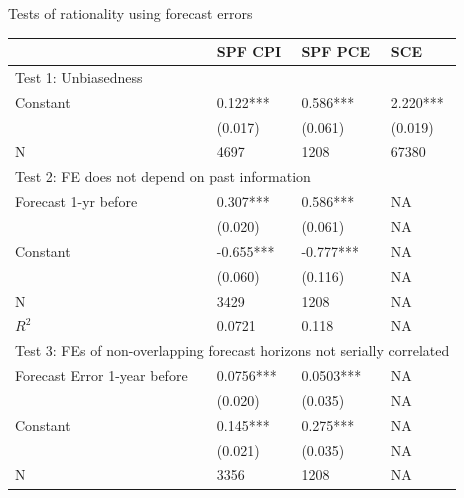 \documentclass{beamer}
\begin{document}
\begin{frame}{Tests of rationality using forecast errors}
	\begin{adjustbox}{totalheight=0.9\textheight}
	\label{NullTestTable}
	\centering 
	\begin{tabular}{llll}
		\hline 
		& SPF CPI          & SPF PCE          & SCE            \\
		\hline 
		\multicolumn{4}{l}{Test 1: Unbiasedness}                                                           \\
		\hline 
		Constant                            & 0.122***         & 0.586***         & 2.220***       \\
		& (0.017)          & (0.061)          & (0.019)        \\
		\hline 
		N                                   & 4697             & 1208             & 67380          \\
		\hline 
		\multicolumn{4}{l}{Test 2: FE does not depend on past information}                                  \\
		\hline 
		Forecast 1-yr before                & 0.307***         & 0.586***         & NA             \\
		& (0.020)          & (0.061)          & NA             \\
		Constant                            & -0.655***        & -0.777***        & NA             \\
		& (0.060)          & (0.116)          & NA             \\
		\hline 
		N                                   & 3429             & 1208             & NA             \\
		$R^2$                 & 0.0721           & 0.118            & NA             \\
		\hline 
		\multicolumn{4}{l}{Test 3: FEs of non-overlapping forecast horizons not serially correlated} \\
		\hline 
		Forecast Error 1-year before        & 0.0756***        & 0.0503***        & NA             \\
		& (0.020)          & (0.035)          & NA             \\
		Constant                            & 0.145***         & 0.275***         & NA             \\
		& (0.021)          & (0.035)          & NA             \\
		\hline 
		N                                   & 3356             & 1208             & NA             \\

\end{tabular}
\end{adjustbox}
\end{frame}
\end{document}
